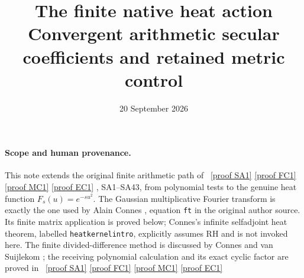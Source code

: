 \documentclass[11pt]{article}
\title{The finite native heat action\\
Convergent arithmetic secular coefficients and retained metric control}
\author{}\date{20 September 2026}
\begin{document}
\maketitle

\paragraph{Scope and human provenance.}
This note extends the original finite arithmetic path of
\cite{NativeAction}%
~\href{https://github.com/KokunoYumeto/zeta-function-research-reader/blob/5992ad50c0f2a06921f1fcaded7b4e38097c0739/workbenches/splitzero-tandem/continuations/20260920-original-kernel-mixed-determinants/providers/NATIVE_SPECTRAL_ACTION.tex\#L31}{[proof SA1]} \href{https://github.com/KokunoYumeto/zeta-function-research-reader/blob/5992ad50c0f2a06921f1fcaded7b4e38097c0739/workbenches/splitzero-tandem/continuations/20260920-original-kernel-mixed-determinants/providers/SOURCE_FUNCTION_CLASS_CHECK.tex\#L24}{[proof FC1]} \href{https://github.com/KokunoYumeto/zeta-function-research-reader/blob/5992ad50c0f2a06921f1fcaded7b4e38097c0739/workbenches/splitzero-tandem/continuations/20260920-original-kernel-mixed-determinants/providers/RANK_ONE_METRIC_CURVATURE.tex\#L35}{[proof MC1]} \href{https://github.com/KokunoYumeto/zeta-function-research-reader/blob/5992ad50c0f2a06921f1fcaded7b4e38097c0739/workbenches/splitzero-tandem/continuations/20260920-original-kernel-mixed-determinants/providers/INDEPENDENT_ENDPOINT_CHECK.tex\#L28}{[proof EC1]}%
{}, SA1--SA43, from polynomial tests to the
genuine heat function \(F_s(u)=e^{-su^2}\).
The Gaussian multiplicative Fourier transform is exactly the
one used by Alain Connes \cite{ConnesHeat}, equation
\texttt{ft} in the original author source. Its finite matrix
application is proved below; Connes's infinite selfadjoint
heat theorem, labelled \texttt{heatkernelintro}, explicitly
assumes RH and is not invoked here.
The finite divided-difference method is discussed by Connes
and van Suijlekom \cite{CV}; the receiving polynomial
calculation and its exact cyclic factor are proved in
\cite{NativeAction}%
~\href{https://github.com/KokunoYumeto/zeta-function-research-reader/blob/5992ad50c0f2a06921f1fcaded7b4e38097c0739/workbenches/splitzero-tandem/continuations/20260920-original-kernel-mixed-determinants/providers/NATIVE_SPECTRAL_ACTION.tex\#L31}{[proof SA1]} \href{https://github.com/KokunoYumeto/zeta-function-research-reader/blob/5992ad50c0f2a06921f1fcaded7b4e38097c0739/workbenches/splitzero-tandem/continuations/20260920-original-kernel-mixed-determinants/providers/SOURCE_FUNCTION_CLASS_CHECK.tex\#L24}{[proof FC1]} \href{https://github.com/KokunoYumeto/zeta-function-research-reader/blob/5992ad50c0f2a06921f1fcaded7b4e38097c0739/workbenches/splitzero-tandem/continuations/20260920-original-kernel-mixed-determinants/providers/RANK_ONE_METRIC_CURVATURE.tex\#L35}{[proof MC1]} \href{https://github.com/KokunoYumeto/zeta-function-research-reader/blob/5992ad50c0f2a06921f1fcaded7b4e38097c0739/workbenches/splitzero-tandem/continuations/20260920-original-kernel-mixed-determinants/providers/INDEPENDENT_ENDPOINT_CHECK.tex\#L28}{[proof EC1]}%
\end{document}
